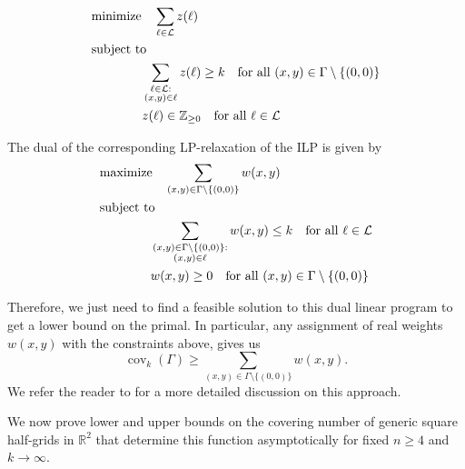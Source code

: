 \documentclass[usenames,dvipsnames, 11pt]{article}
\numberwithin{thm}{section}
\theoremstyle{definition}
\theoremstyle{definition}
\theoremstyle{definition}
\newcommand{\cov}[1]{\operatorname{cov}_{#1}}
\newcommand{\1}{\mathbf{1}}
\def\cL{{\mathcal L}}
\begin{document}
\begin{align*}
    &\text{minimize} \quad \sum\limits_{\ell\in \cL} z(\ell)\\
    &\text{subject to}\notag\\
    &\quad\quad\quad\quad\sum\limits_{\substack{\ell\in \cL:\\ (x,y)\in \ell}} z(\ell) \geq k \quad \text{for all }(x,y)\in \Gamma \setminus \{(0,0)\} \\
    &\quad\quad\quad\quad z(\ell) \in \mathbb{Z}_{\geq 0} \quad \text{for all }\ell\in \cL
\end{align*}

\noindent
The dual of the corresponding LP-relaxation of the ILP is given by
\begin{align*}
    &\text{maximize} \quad \sum\limits_{(x,y)\in \Gamma \setminus \{(0,0)\}} w(x,y)\\
    &\text{subject to}\notag\\
    &\quad\quad\quad\quad \sum\limits_{\substack{(x,y)\in \Gamma \setminus \{(0,0)\}:\\ (x,y)\in \ell}} w(x,y) \leq k \quad \text{for all }\ell\in \mathcal{L}\notag\\
    &\quad\quad\quad\quad w(x,y) \geq 0 \quad \text{for all }(x,y)\in \Gamma \setminus \{(0,0)\} \notag
\end{align*}

Therefore, we just need to find a feasible solution to this dual linear program to get a lower bound on the primal.
In particular, any assignment of real weights $w(x, y)$ with the constraints above, gives us \[\cov{k}(\Gamma) \geq \sum_{(x, y) \in \Gamma \setminus \{(0, 0)\}} w(x, y).\]
We refer the reader to \cite[Section 2]{BBDD23} for a more detailed discussion on this approach. 

We now prove lower and upper bounds on the covering number of generic square half-grids in $\mathbb{R}^2$ that determine this function asymptotically for fixed $n \geq 4$ and $k \rightarrow \infty$.
\end{document}
